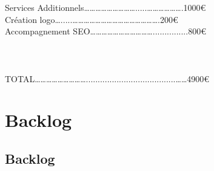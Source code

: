 \documentclass[a4paper,12pt]{report}
\begin{document}
Services Additionnels……………………….....……………….1000\euro  \\
\hangindent=1.5cm    Création logo….....……………………………………….200\euro  \\
    Accompagnement SEO……………………………...............800\euro  \\
\\\\\\
TOTAL………………………......................................……4900\euro \\

\part{Backlog}
\chapter{Backlog}
\end{document}
